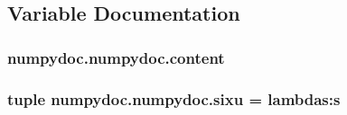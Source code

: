 \subsection{Variable Documentation}
\hypertarget{namespacenumpydoc_1_1numpydoc_a0bce04ee9930d54ea185492a936a1248}{}
\subsubsection[{content}]{\setlength{\rightskip}{0pt plus 5cm}numpydoc.\+numpydoc.\+content}\label{namespacenumpydoc_1_1numpydoc_a0bce04ee9930d54ea185492a936a1248}
\hypertarget{namespacenumpydoc_1_1numpydoc_a55f739eb45c34ad39e91eefc96fe8cdc}{}
\subsubsection[{sixu}]{\setlength{\rightskip}{0pt plus 5cm}tuple numpydoc.\+numpydoc.\+sixu = lambdas\+:s}\label{namespacenumpydoc_1_1numpydoc_a55f739eb45c34ad39e91eefc96fe8cdc}
